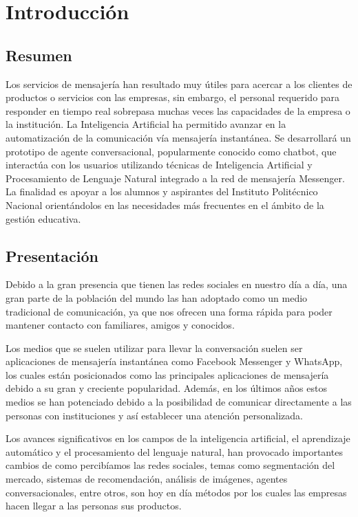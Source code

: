 \chapter{Introducción}

\section{Resumen}
    Los servicios de mensajería han resultado muy útiles para acercar a los clientes de productos o servicios con las empresas, sin embargo, el personal requerido para responder en tiempo real sobrepasa muchas veces las capacidades de la empresa o la institución. La Inteligencia Artificial ha permitido avanzar en la automatización de la comunicación vía mensajería instantánea. Se desarrollará un prototipo de agente conversacional, popularmente conocido como chatbot, que interactúa con los usuarios utilizando técnicas de Inteligencia Artificial y Procesamiento de Lenguaje Natural integrado a la red de mensajería Messenger. La finalidad es apoyar a los alumnos y aspirantes del Instituto Politécnico Nacional orientándolos en las necesidades más frecuentes en el ámbito de la gestión educativa.

\section{Presentación}
    
    Debido a la gran presencia que tienen las redes sociales en nuestro día a día, una gran parte de la población del mundo las han adoptado como un medio tradicional de comunicación, ya que nos ofrecen una forma rápida para poder mantener contacto con familiares, amigos y conocidos.
    
    Los medios que se suelen utilizar para llevar la conversación suelen ser aplicaciones de mensajería instantánea como Facebook Messenger y WhatsApp, los cuales están posicionados como las principales aplicaciones de mensajería debido a su gran y creciente popularidad. Además, en los últimos años estos medios se han potenciado debido a la posibilidad de comunicar directamente a las personas con instituciones y así establecer una atención personalizada.

    Los avances significativos en los campos de la inteligencia artificial, el aprendizaje automático y el procesamiento del lenguaje natural, han provocado importantes cambios de como percibíamos las redes sociales, temas como segmentación del mercado, sistemas de recomendación, análisis de imágenes, agentes conversacionales, entre otros, son hoy en día métodos por los cuales las empresas hacen llegar a las personas sus productos.
    
